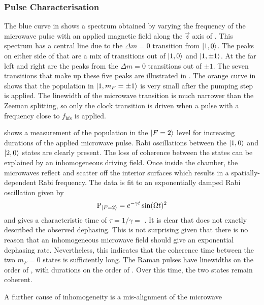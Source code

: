 \subsubsection{Pulse Characterisation}
The blue curve in  shows a spectrum obtained by
varying the frequency of the microwave pulse with an applied magnetic field along the $\vec{z}$ axis of
. This spectrum has a central line due to the
$\Delta m = 0$ transition from $\ket{1,0}$. The peaks on either side
of that are a mix of transitions out of $\ket{1,0}$ and
$\ket{1,\pm1}$. At the far left and right are the peaks from the
$\Delta m = 0$ transitions out of $\pm 1$. The seven transitions that
make up these five peaks are illustrated in
. The orange curve
in~ shows 
that the population in \(\ket{1,m_F=\pm 1}\) is very small after
the  pumping step is applied. The linewidth of the
microwave transition is much narrower than the Zeeman splitting, so
only the clock transition is driven when a pulse with a frequency
close to \(f_\text{hfs}\) is applied. 
\par\noindent
{} shows a measurement of the population in the
\(\ket{F=2}\) level for increasing durations of the applied
microwave pulse. Rabi oscillations between the \(\ket{1,0}\) and
\(\ket{2,0}\) states are clearly present. The loss of coherence
between the states can be explained by an inhomogeneous driving field.
Once inside the chamber, the microwaves reflect and scatter off the
interior surfaces which results in a spatially-dependent Rabi
frequency. The data is fit to an exponentially damped Rabi oscillation
given by
\begin{equation}
  \text{P}_{\ket{F=2}} = e^{-\gamma t} \sin(\Omega t)^2
  \label{eq:damped_rabi}
\end{equation}
and gives a characteristic time of $\tau = 1/\gamma =$
. It is clear that 
does not exactly described the observed dephasing. This is not
surprising given that there is no reason that an inhomogeneous
microwave field should give an exponential dephasing rate.
Nevertheless, this indicates that the coherence time between the two
$m_F=0$ states is sufficiently long. The Raman pulses have linewidths
on the order of , with durations on the order of
. Over this time, the two states remain coherent.
\par\noindent
A further cause of inhomogeneity is a mis-alignment of the microwave
